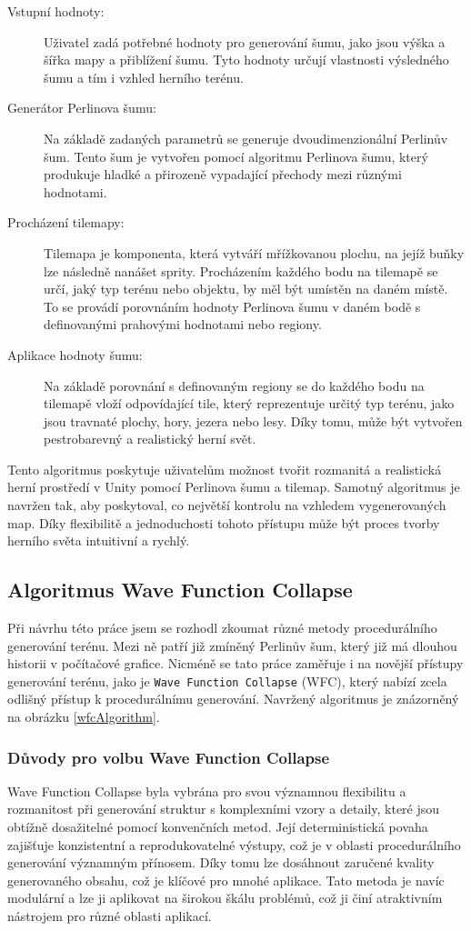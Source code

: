 \begin{description}
	\item[Vstupní hodnoty:] Uživatel zadá potřebné hodnoty pro generování šumu, jako jsou výška a šířka mapy a přiblížení šumu. Tyto hodnoty určují vlastnosti výsledného šumu a tím i vzhled herního terénu.
	\item[Generátor Perlinova šumu:] Na základě zadaných parametrů se generuje dvoudimenzionální Perlinův šum. Tento šum je vytvořen pomocí algoritmu Perlinova šumu, který produkuje hladké a přirozeně vypadající přechody mezi různými hodnotami.
	\item[Procházení tilemapy:] Tilemapa je komponenta, která vytváří mřížkovanou plochu, na jejíž buňky lze následně nanášet sprity. Procházením každého bodu na tilemapě se určí, jaký typ terénu nebo objektu, by měl být umístěn na daném místě. To se provádí porovnáním hodnoty Perlinova šumu v daném bodě s definovanými prahovými hodnotami nebo regiony.
	\item[Aplikace hodnoty šumu:] Na základě porovnání s definovaným regiony se do každého bodu na tilemapě vloží odpovídající tile, který reprezentuje určitý typ terénu, jako jsou travnaté plochy, hory, jezera nebo lesy. Díky tomu, může být vytvořen pestrobarevný a realistický herní svět.
\end{description}

Tento algoritmus poskytuje uživatelům možnost tvořit rozmanitá a realistická herní prostředí v Unity pomocí Perlinova šumu a tilemap. Samotný algoritmus je navržen tak, aby poskytoval, co největší kontrolu na vzhledem vygenerovaných map. Díky flexibilitě a jednoduchosti tohoto přístupu může být proces tvorby herního světa intuitivní a rychlý. 

\subsection{Algoritmus Wave Function Collapse}
Při návrhu této práce jsem se rozhodl zkoumat různé metody procedurálního generování terénu. Mezi ně patří již zmíněný Perlinův šum, který již má dlouhou historii v počítačové grafice. Nicméně se tato práce zaměřuje i na novější přístupy generování terénu, jako je \texttt{Wave Function Collapse} (WFC), který nabízí zcela odlišný přístup k procedurálnímu generování. Navržený algoritmus je znázorněný na obrázku \ref{wfcAlgorithm}.

\subsubsection{Důvody pro volbu Wave Function Collapse}
Wave Function Collapse byla vybrána pro svou významnou flexibilitu a rozmanitost při generování struktur s komplexními vzory a detaily, které jsou obtížně dosažitelné pomocí konvenčních metod. Její deterministická povaha zajišťuje konzistentní a reprodukovatelné výstupy, což je v oblasti procedurálního generování významným přínosem. Díky tomu lze dosáhnout zaručené kvality generovaného obsahu, což je klíčové pro mnohé aplikace. Tato metoda je navíc modulární a lze ji aplikovat na širokou škálu problémů, což ji činí atraktivním nástrojem pro různé oblasti aplikací.

